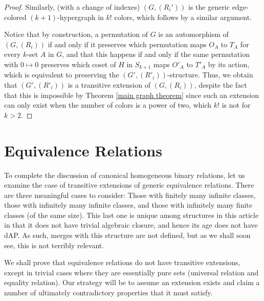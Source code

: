 \documentclass{amsart}
\begin{document}
\begin{proof}
    Similarly, (with a change of indexes) $(G, (R_i'))$ is the generic edge-colored $(k+1)$-hypergraph in $k!$ colors, which follows by a similar argument.

    Notice that by construction, a permutation of $G$ is an automorphism of $(G, (R_i))$ if and only if it preserves which permutation maps $O_A$ to $T_A$ for every $k$-set $A$ in $G$, and that this happens if and only if the same permutation with $0\mapsto 0$ preserves which coset of $H$ in $S_{k+1}$ maps $O'_A$ to $T'_A$ by its action, which is equivalent to preserving the $(G',(R'_i))$-structure. Thus, we obtain that $(G',(R'_i))$ is a transitive extension of $(G, (R_i))$, despite the fact that this is impossible by Theorem \ref{main graph theorem} since such an extension can only exist when the number of colors is a power of two, which $k!$ is not for $k > 2$.

    
\end{proof}






\section{Equivalence Relations}

To complete the discussion of canonical homogeneous binary relations, let us examine the case of transitive extensions of generic equivalence relations. There are three meaningful cases to consider: Those with finitely many infinite classes,  those with infinitely many infinite classes, and those with infinitely many finite classes (of the same size). This last one is unique among structures in this article in that it does not have trivial algebraic closure, and hence its age does not have dAP. As such, merges with this structure are not defined, but as we shall soon see, this is not terribly relevant.

We shall prove that equivalence relations do not have transitive extensions, except in trivial cases where they are essentially pure sets (universal relation and equality relation). Our strategy will be to assume an extension exists and claim a number of ultimately contradictory properties that it must satisfy.
\end{document}

